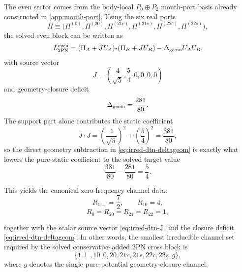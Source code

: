 \documentclass[11pt]{article}
\newcommand{\TwoPN}{\mathrm{2PN}}
\begin{document}
The even sector comes from the body-local
\(P_0\oplus P_2\) mouth-port basis already constructed in
\cref{app:mouth-port}.  Using the six real ports
\begin{equation}
\Pi
\equiv
\bigl(
\Pi^{(0)},\Pi^{(20)},\Pi^{(21c)},\Pi^{(21s)},\Pi^{(22c)},\Pi^{(22s)}
\bigr),
\label{eq:irred-dtn-pi-basis}
\end{equation}
the solved even block can be written as
\begin{equation}
L^{\rm even}_{2\mathrm{PN}}
=(\Pi_A+JU_A)\!\cdot\!(\Pi_B+JU_B)-\Delta_{\rm geom}U_AU_B,
\label{eq:irred-dtn-even-zero}
\end{equation}
with source vector
\begin{equation}
J=\left(\frac{4}{\sqrt5},\frac54,0,0,0,0\right)
\label{eq:irred-dtn-J}
\end{equation}
and geometry-closure deficit
\begin{equation}
\Delta_{\rm geom}=\frac{281}{80}.
\label{eq:irred-dtn-deltageom}
\end{equation}
The support part alone contributes the static coefficient
\begin{equation}
J\cdot J
=
\left(\frac{4}{\sqrt5}\right)^2
+\left(\frac54\right)^2
=\frac{381}{80},
\label{eq:irred-dtn-JdotJ}
\end{equation}
so the direct geometry subtraction in
\cref{eq:irred-dtn-deltageom} is exactly what lowers the pure-static coefficient to the
solved target value
\begin{equation}
\frac{381}{80}-\frac{281}{80}=\frac54.
\label{eq:irred-dtn-static-target}
\end{equation}

This yields the canonical zero-frequency channel data:
\begin{equation}
R_{1\perp}=\frac72,
\qquad
R_{10}=4,
\label{eq:irred-dtn-odd-residues}
\end{equation}
\begin{equation}
R_0=R_{20}=R_{21}=R_{22}=1,
\label{eq:irred-dtn-even-residues}
\end{equation}

together with the scalar source vector \cref{eq:irred-dtn-J} and the closure deficit
\cref{eq:irred-dtn-deltageom}.  In other words, the smallest irreducible channel set
required by the solved conservative added \(\TwoPN\) cross block is
\begin{equation}
\{1\perp,10,0,20,21c,21s,22c,22s,g\},
\label{eq:irred-dtn-minimal-channel-set}
\end{equation}
where \(g\) denotes the single pure-potential geometry-closure channel.
\end{document}

